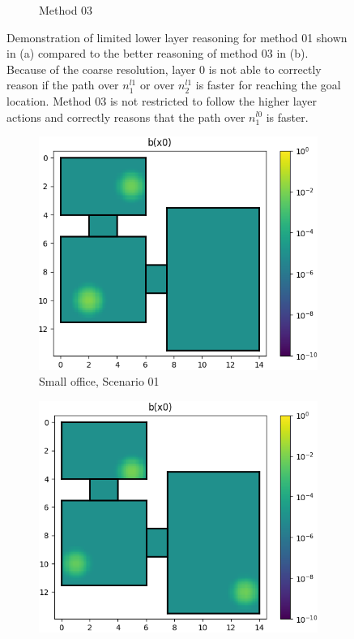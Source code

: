 \begin{figure}
\begin{subfigure}[b]{0.49\textwidth}
        \caption{Method 03}
        \label{subfig:problem2_M3}
    \end{subfigure}
    \caption{Demonstration of limited lower layer reasoning for method 01 shown in (a) compared to the better reasoning of method 03 in (b). Because of the coarse resolution, layer 0 is not able to correctly reason if the path over $n_1^{l1}$ or over $n_2^{l1}$ is faster for reaching the goal location. Method 03 is not restricted to follow the higher layer actions and correctly reasons that the path over $n_1^{l0}$ is faster.}
    \label{fig:M1_prob02}
\end{figure}
\begin{figure}
    \centering
    \begin{subfigure}[b]{0.49\textwidth}
        \includegraphics[width=\textwidth]{Report/images/scenarios/envsmall_sc01.png}
        \caption{Small office, Scenario 01}
        \label{subfig:sc01}
    \end{subfigure}
    \hfill
     \begin{subfigure}[b]{0.49\textwidth}
        \includegraphics[width=\textwidth]{Report/images/scenarios/envsmall_sc03.png}

\end{subfigure}
\end{figure}
